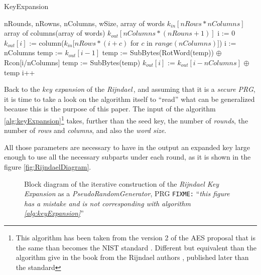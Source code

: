 \documentclass[10pt,a4paper,twoside]{llncs}
\newcommand{\fixme}[1]{\texttt{\color{red}FIXME:} ``\emph{#1}''}
\newcommand{\rijndael}{\emph{Rijndael}}
\begin{document}
\begin{algorithm}
 \caption{KeyExpansion}
 \label{alg:keyExpansion}
 \begin{algorithmic}[1]
  \REQUIRE nRounds, nRowns, nColumns, wSize, array of words $k_{in}[nRows*nColumns]$
  \ENSURE array of columns(array of words) $k_{out}[nColumns*(nRouns+1)]$
  \STATE i := 0
    \STATE $k_{out}[i]$ := column($k_{in}[nRows*(i+c)$ for $c$ in $range(nColumns)]$)
  \ENDWHILE
  \STATE i := nColumns
    \STATE temp := $k_{out}[i-1]$
      \STATE temp := SubBytes(RotWord(temp)) $\oplus$ Rcon[i/nColumns]
    \ELSE
      \STATE temp := SubBytes(temp)
    \ENDIF
    \STATE $k_{out}[i]$ := $k_{out}[i-nColumns]$ $\oplus$ temp
    \STATE i++
  \ENDWHILE
 \end{algorithmic}
\end{algorithm}

Back to the \emph{key expansion} of the \rijndael\,, and assuming that it is a \emph{secure PRG}, it is time to take a look on the algorithm itself to ``read'' what can be generalized because this is the purpose of this paper. The input of the algorithm \ref{alg:keyExpansion}\footnote{This algorithm has been taken from the version 2 of the AES proposal \cite{Daemen01aes-ammended} that is the same than becomes the NIST standard \cite{AES-FIPS}. Different but equivalent than the algorithm give in the book from the Rijndael authors \cite{Daemen:2002:DR:560131}, published later than the standard} takes, further than the seed key, the number of \emph{rounds}, the number of \emph{rows} and \emph{columns}, and also the \emph{word size}.

All those parameters are necessary to have in the output an expanded key large enough to use all the necessary subparts under each round, as it is shown in the figure \ref{fig:RijndaelDiagram}.

\begin{figure}[ht]
\begin{center}

\caption{Block diagram of the iterative construction of the \emph{Rijndael Key Expansion} as a \emph{PseudoRandomGenerator}, PRG \fixme{this figure has a mistake and is not corresponding with algorithm \ref{alg:keyExpansion}}}
\label{fig:keyExpansionDiagram}
\end{center}
\end{figure}
\end{document}
